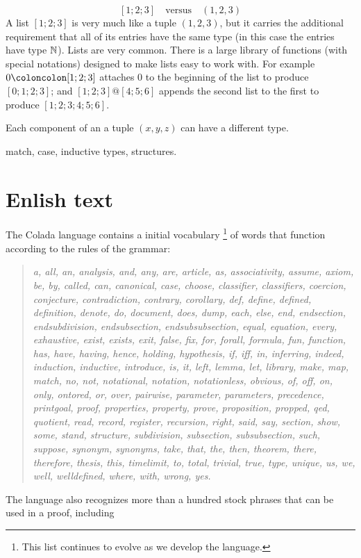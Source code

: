 \documentclass[12pt]{article}
\numberwithin{definition}{section}
\begin{document}
\[
\boxed{[1;2;3]} \quad\text{versus}\quad \boxed{(1,2,3)}
\]
A list $[1;2;3]$ is very much like a tuple $(1,2,3)$, but it
carries the additional requirement that all of its entries have the
same type (in this case the entries have type ${\mathbb N}$).  Lists are very
common.  There is a large library of functions (with special
notations) designed to make lists easy to work with.  For example $0
\coloncolon[1;2;3]$ attaches $0$ to the beginning of the list to
produce $[0;1;2;3]$; and $[1;2;3] @ [4;5;6]$ appends the second list
to the first to produce $[1;2;3;4;5;6]$.

Each component of an a tuple $(x,y,z)$ can have a different type.


match,  case, inductive types, structures.

\section{Enlish text}

The Colada language contains a initial vocabulary%
\footnote{This list continues to evolve as we develop the language.}
%
of words that function according to the rules of the grammar:

\begin{quote}
{\it a, all, an, analysis, and, any, are, article, as, associativity,
assume, axiom, be, by, called, can, canonical, case, choose,
classifier, classifiers, coercion, conjecture, contradiction,
contrary, corollary, def, define, defined, definition, denote, do,
document, does, dump, each, else, end, endsection, endsubdivision,
endsubsection, endsubsubsection, equal, equation, every, exhaustive,
exist, exists, exit, false, fix, for, forall, formula, fun, function,
has, have, having, hence, holding, hypothesis, if, iff, in, inferring,
indeed, induction, inductive, introduce, is, it, left, lemma, let,
library, make, map, match, no, not, notational, notation,
notationless, obvious, of, off, on, only, ontored, or, over, pairwise,
parameter, parameters, precedence, printgoal, proof, properties,
property, prove, proposition, propped, qed, quotient, read, record,
register, recursion, right, said, say, section, show, some, stand,
structure, subdivision, subsection, subsubsection, such, suppose,
synonym, synonyms, take, that, the, then, theorem, there, therefore,
thesis, this, timelimit, to, total, trivial, true, type, unique, us,
we, well, welldefined, where, with, wrong, yes.}
\end{quote}


The language also recognizes more than a hundred stock phrases that
can be used in a proof, including
\end{document}
